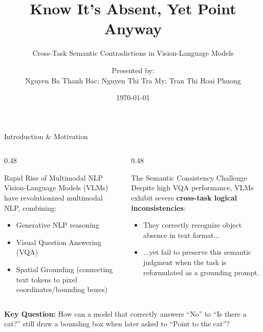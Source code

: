 \documentclass[aspectratio=169]{beamer}
\title[VLM Cross-Task Contradictions]{Know It's Absent, Yet Point Anyway}
\subtitle{Cross-Task Semantic Contradictions in Vision-Language Models}
\author[Bac, My, Phuong]{Presented by:\\Nguyen Ba Thanh Bac; Nguyen Thi Tra My; Tran Thi Hoai Phuong}
\institute{NLP Course Presentation (2025/2026)}
\date{\today}
\begin{document}
\begin{frame}[plain]
    \titlepage
\end{frame}

\begin{frame}{Introduction \& Motivation}
    \begin{columns}[T]
        \begin{column}{0.48\textwidth}
            \begin{block}{Rapid Rise of Multimodal NLP}
                Vision-Language Models (VLMs) have revolutionized multimodal NLP, combining:
                \begin{itemize}
                    \item Generative NLP reasoning
                    \item Visual Question Answering (VQA)
                    \item Spatial Grounding (connecting text tokens to pixel coordinates/bounding boxes)
                \end{itemize}
            \end{block}
        \end{column}
        
        \begin{column}{0.48\textwidth}
            \begin{alertblock}{The Semantic Consistency Challenge}
                Despite high VQA performance, VLMs exhibit severe \textbf{cross-task logical inconsistencies}:
                \begin{itemize}
                    \item They correctly recognize object absence in text format...
                    \item ...yet fail to preserve this semantic judgment when the task is reformulated as a grounding prompt.
                \end{itemize}
            \end{alertblock}
        \end{column}
    \end{columns}
    
    \vspace{0.2cm}
    \centering
    \textcolor{secondary}{\textbf{Key Question:}} How can a model that correctly answers ``No'' to ``Is there a cat?'' still draw a bounding box when later asked to ``Point to the cat''?
\end{frame}
\end{document}
